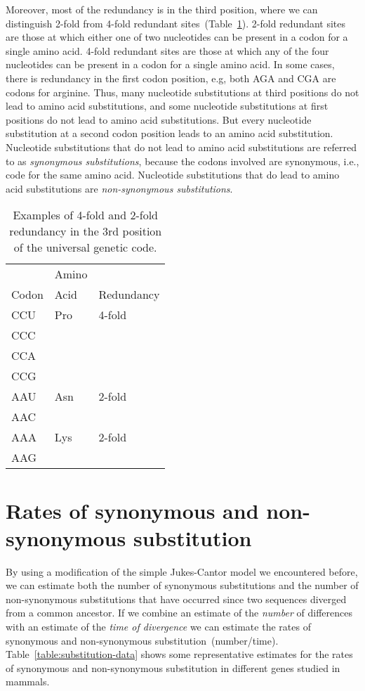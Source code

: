 \documentclass[12pt]{article}
\begin{document}
Moreover, most of the redundancy is in the third position, where we
can distinguish 2-fold from 4-fold redundant
sites~(Table~\ref{table:fold}). 2-fold redundant sites are those at
which either one of two nucleotides can be present in a codon for a
single amino acid. 4-fold redundant sites are those at which any of
the four nucleotides can be present in a codon for a single amino
acid. In some cases, there is redundancy in the first codon position,
e.g, both AGA and CGA are codons for arginine. Thus, many nucleotide
substitutions at third positions do not lead to amino acid
substitutions, and some nucleotide substitutions at first positions do
not lead to amino acid substitutions. But every nucleotide
substitution at a second codon position leads to an amino acid
substitution. Nucleotide substitutions that do not lead to amino acid
substitutions are referred to as {\it synonymous substitutions},
because the codons involved are synonymous, i.e., code for the same
amino acid. Nucleotide substitutions that do lead to amino acid
substitutions are {\it non-synonymous substitutions}.

\begin{table}
\begin{center}
\begin{tabular}{lll}
\hline\hline
      & Amino & \\
Codon & Acid  & Redundancy \\
\hline
CCU   & Pro   & 4-fold \\
CCC \\
CCA \\
CCG \\
\hline
AAU   & Asn   & 2-fold \\
AAC \\
AAA   & Lys   & 2-fold \\
AAG \\
\hline
\end{tabular}
\end{center}
\caption{Examples of 4-fold and 2-fold redundancy in the 3rd position
  of the universal genetic code.}\label{table:fold}
\end{table}

\section*{Rates of synonymous and non-synonymous substitution}

By using a modification of the simple Jukes-Cantor model we
encountered before, we can estimate both the number of synonymous
substitutions and the number of non-synonymous substitutions that have
occurred since two sequences diverged from a common ancestor. If we
combine an estimate of the {\it number\/} of differences with an
estimate of the {\it time of divergence\/} we can estimate the rates
of synonymous and non-synonymous
substitution~(number/time). Table~\ref{table:substitution-data} shows
some representative estimates for the rates of synonymous and
non-synonymous substitution in different genes studied in
mammals.
\end{document}
